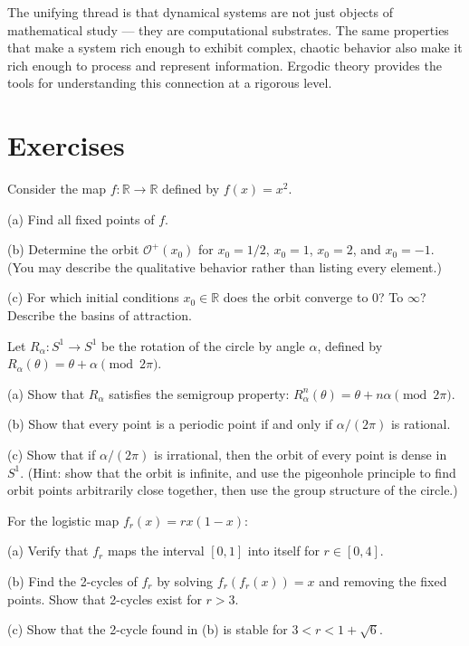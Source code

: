 The unifying thread is that dynamical systems are not just objects of mathematical study --- they are computational substrates. The same properties that make a system rich enough to exhibit complex, chaotic behavior also make it rich enough to process and represent information. Ergodic theory provides the tools for understanding this connection at a rigorous level.


\section*{Exercises}

\begin{exercise}
Consider the map $f: \mathbb{R} \to \mathbb{R}$ defined by $f(x) = x^2$.

(a) Find all fixed points of $f$.

(b) Determine the orbit $\mathcal{O}^+(x_0)$ for $x_0 = 1/2$, $x_0 = 1$, $x_0 = 2$, and $x_0 = -1$. (You may describe the qualitative behavior rather than listing every element.)

(c) For which initial conditions $x_0 \in \mathbb{R}$ does the orbit converge to $0$? To $\infty$? Describe the basins of attraction.


\bigskip

\end{exercise}


\begin{exercise}
Let $R_\alpha: S^1 \to S^1$ be the rotation of the circle by angle $\alpha$, defined by $R_\alpha(\theta) = \theta + \alpha \pmod{2\pi}$.

(a) Show that $R_\alpha$ satisfies the semigroup property: $R_\alpha^n(\theta) = \theta + n\alpha \pmod{2\pi}$.

(b) Show that every point is a periodic point if and only if $\alpha/(2\pi)$ is rational.

(c) Show that if $\alpha/(2\pi)$ is irrational, then the orbit of every point is dense in $S^1$. (Hint: show that the orbit is infinite, and use the pigeonhole principle to find orbit points arbitrarily close together, then use the group structure of the circle.)


\bigskip

\end{exercise}


\begin{exercise}
For the logistic map $f_r(x) = rx(1-x)$:

(a) Verify that $f_r$ maps the interval $[0,1]$ into itself for $r \in [0, 4]$.

(b) Find the 2-cycles of $f_r$ by solving $f_r(f_r(x)) = x$ and removing the fixed points. Show that 2-cycles exist for $r > 3$.

(c) Show that the 2-cycle found in (b) is stable for $3 < r < 1 + \sqrt{6}$.


\bigskip

\end{exercise}


